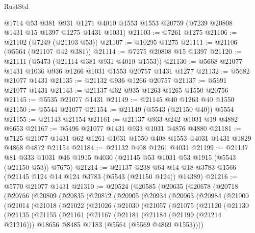 \begin{lexlean}{RustStd}
\begin{coremodule}
    @1714
    @53
    @381
    @931
    @1271
    @4010
    @1553
    @1553
    @20759
    (@7239 @20808 @1431 @15 @1397 @1275 @1431 @1031)
@21103 := @7261 @1275
@21106 := @21102 (@7249 (@21103 @53))
@21107 := @10295 @1275
@21111 := @21106 (@5564 (@21107 @42 @381))
@21114 := @7275 @20808 @15 @1397
@21120 := @21111 (@5473 (@21114 @381 @931 @4010 @1553))
@21130 := @5668 @21077 @1431 @1036 @936 @1266 @1031 @1553 @20757 @1431 @1277
@21132 := @5682 @21077 @1431
@21135 := @21132 @936 @1266 @20757
@21137 := @5691 @21077 @1431
@21143 := @21137 @62 @935 @1263 @1265 @1550 @20756
@21145 := @5535 @21077 @1431
@21149 := @21145 @40 @1263 @40 @1550
@21150 := @5544 @21077
@21154 := @21149 (@5543 (@21150 @40)) @5554
@21155 := @21143 @21154
@21161 := @21137 @933 @242 @1031 @19 @4882 @6653
@21167 := @5496 @21077 @1431 @933 @1031 @4876 @4880
@21181 := @7125 @21077 @1431 @62 @1261 @1031 @1550 @408 @1553 @4031 @1431 @1829 @4868 @4872 @21154
@21184 := @21132 @408 @1261 @4031
@21199 := @21137
    @81
    @333
    @1031
    @46
    @1915
    @4030
    (@21145 @53 @1031 @53 @1915 (@5543 (@21150 @53)) @7675)
@21214 := @21137
    @238
    @64
    @14
    @18
    @3783
    @1566
    (@21145 @124 @14 @124 @3783 (@5543 (@21150 @124)) @14389)
@21216 := @5770 @21077 @1431
@21310 := @20524
    (@20585
      (@20635
        (@20678
          (@20718
            (@20766
              (@20809
                (@20835
                  (@20872
                    (@20905
                      (@20934
                        (@20963
                          (@20984
                            (@21000
                              (@21014
                                (@21018
                                  (@21022
                                    (@21026
                                      (@21030
                                        (@21057
                                          (@21075
                                            (@21120
                                              (@21130
                                                (@21135
                                                  (@21155
                                                    (@21161
                                                      (@21167
                                                        (@21181
                                                          (@21184 (@21199 (@21214 @21216)))
                                                          @18656
                                                          @8485
                                                          @7183
                                                          (@5564 (@5569 @4869 @1553))))

\end{coremodule}
\end{lexlean}
